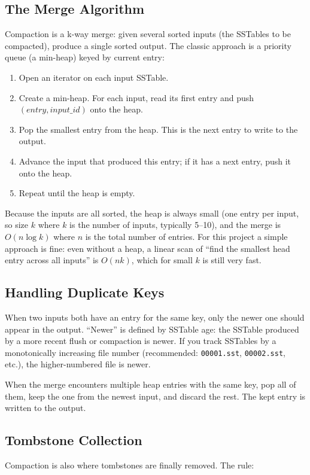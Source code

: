 \documentclass[11pt,a4paper]{article}
\begin{document}
\subsection{The Merge Algorithm}
Compaction is a k-way merge: given several sorted inputs (the SSTables to be compacted), produce a single sorted output. The classic approach is a priority queue (a min-heap) keyed by current entry:

\begin{enumerate}
\item Open an iterator on each input SSTable.
\item Create a min-heap. For each input, read its first entry and push $(entry, input\_id)$ onto the heap.
\item Pop the smallest entry from the heap. This is the next entry to write to the output.
\item Advance the input that produced this entry; if it has a next entry, push it onto the heap.
\item Repeat until the heap is empty.
\end{enumerate}

Because the inputs are all sorted, the heap is always small (one entry per input, so size $k$ where $k$ is the number of inputs, typically 5--10), and the merge is $O(n \log k)$ where $n$ is the total number of entries. For this project a simple approach is fine: even without a heap, a linear scan of ``find the smallest head entry across all inputs'' is $O(n k)$, which for small $k$ is still very fast.

\subsection{Handling Duplicate Keys}
When two inputs both have an entry for the same key, only the newer one should appear in the output. ``Newer'' is defined by SSTable age: the SSTable produced by a more recent flush or compaction is newer. If you track SSTables by a monotonically increasing file number (recommended: \texttt{00001.sst}, \texttt{00002.sst}, etc.), the higher-numbered file is newer.

When the merge encounters multiple heap entries with the same key, pop all of them, keep the one from the newest input, and discard the rest. The kept entry is written to the output.

\subsection{Tombstone Collection}
Compaction is also where tombstones are finally removed. The rule:
\end{document}
